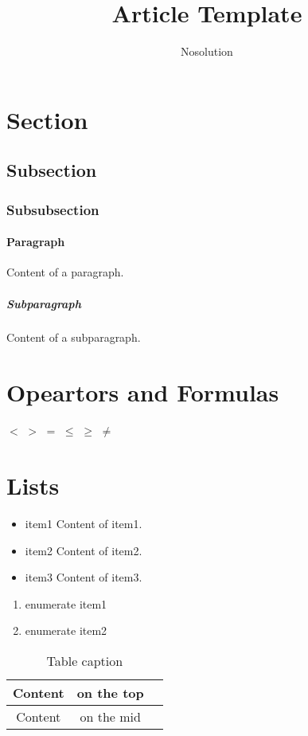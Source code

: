 \documentclass{article}
\title{Article Template}
\author{Nosolution}
\date{}
\begin{document}
    \maketitle
	\section{Section}
	\subsection{Subsection}
    \subsubsection{Subsubsection}
    \paragraph{Paragraph}
    Content of a paragraph.
    \subparagraph{Subparagraph}
    Content of a subparagraph.

    \section{Opeartors and Formulas}
    $<$ $>$ $=$ $\leq$ $\geq$ $\neq$

    \section{Lists}

    \begin{itemize}
        \item{item1} Content of item1.
        \item{item2} Content of item2.
        \item{item3} Content of item3.
    \end{itemize}
    
    \begin{enumerate}
        \item enumerate item1
        \item enumerate item2
    \end{enumerate}


	\begin{center}
		\begin{table}[!htb]
		\begin{tabular}{ccc}
		\toprule  
		Content & on the top\\
		\midrule 
		Content & on the mid\\
		\bottomrule
		\end{tabular}
		\caption{Table caption}
		\end{table}
    \end{center}
    
\end{document}
